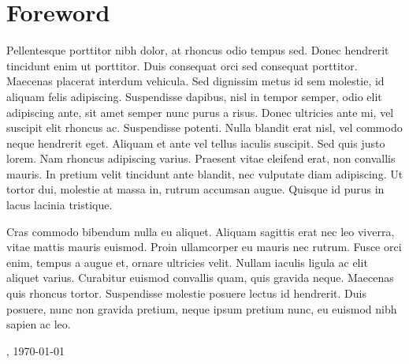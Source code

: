 
\chapter*{Foreword}
\label{chap:foreword}

Pellentesque porttitor nibh dolor, at rhoncus odio tempus sed. Donec hendrerit tincidunt enim ut porttitor. Duis consequat orci sed consequat porttitor. Maecenas placerat interdum vehicula. Sed dignissim metus id sem molestie, id aliquam felis adipiscing. Suspendisse dapibus, nisl in tempor semper, odio elit adipiscing ante, sit amet semper nunc purus a risus. Donec ultricies ante mi, vel suscipit elit rhoncus ac. Suspendisse potenti. Nulla blandit erat nisl, vel commodo neque hendrerit eget. Aliquam et ante vel tellus iaculis suscipit. Sed quis justo lorem. Nam rhoncus adipiscing varius. Praesent vitae eleifend erat, non convallis mauris. In pretium velit tincidunt ante blandit, nec vulputate diam adipiscing. Ut tortor dui, molestie at massa in, rutrum accumsan augue. Quisque id purus in lacus lacinia tristique.

Cras commodo bibendum nulla eu aliquet. Aliquam sagittis erat nec leo viverra, vitae mattis mauris euismod. Proin ullamcorper eu mauris nec rutrum. Fusce orci enim, tempus a augue et, ornare ultricies velit. Nullam iaculis ligula ac elit aliquet varius. Curabitur euismod convallis quam, quis gravida neque. Maecenas quis rhoncus tortor. Suspendisse molestie posuere lectus id hendrerit. Duis posuere, nunc non gravida pretium, neque ipsum pretium nunc, eu euismod nibh sapien ac leo. 
\bigskip

\thesisauthor, \today